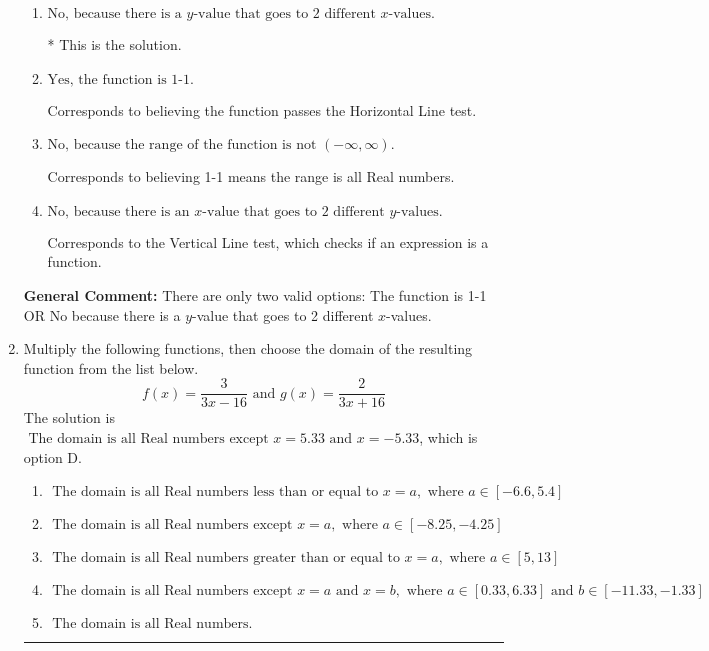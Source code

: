 \documentclass{extbook}[14pt]
\newcommand{\litem}[1]{\item #1

\rule{\textwidth}{0.4pt}}
\begin{document}
\begin{enumerate}
{\begin{enumerate}[label=\Alph*.]
Corresponds to believing 1-1 means the domain is all Real numbers.
\item \( \text{No, because there is a $y$-value that goes to 2 different $x$-values.} \)

* This is the solution.
\item \( \text{Yes, the function is 1-1.} \)

Corresponds to believing the function passes the Horizontal Line test.
\item \( \text{No, because the range of the function is not $(-\infty, \infty)$.} \)

Corresponds to believing 1-1 means the range is all Real numbers.
\item \( \text{No, because there is an $x$-value that goes to 2 different $y$-values.} \)

Corresponds to the Vertical Line test, which checks if an expression is a function.
\end{enumerate}

\textbf{General Comment:} There are only two valid options: The function is 1-1 OR No because there is a $y$-value that goes to 2 different $x$-values.
}
\litem{
Multiply the following functions, then choose the domain of the resulting function from the list below.
\[ f(x) = \frac{3}{3x-16} \text{ and } g(x) = \frac{2}{3x+16} \]The solution is \( \text{ The domain is all Real numbers except } x = 5.33 \text{ and } x = -5.33 \), which is option D.\begin{enumerate}[label=\Alph*.]
\item \( \text{ The domain is all Real numbers less than or equal to } x = a, \text{ where } a \in [-6.6, 5.4] \)


\item \( \text{ The domain is all Real numbers except } x = a, \text{ where } a \in [-8.25, -4.25] \)


\item \( \text{ The domain is all Real numbers greater than or equal to } x = a, \text{ where } a \in [5, 13] \)


\item \( \text{ The domain is all Real numbers except } x = a \text{ and } x = b, \text{ where } a \in [0.33, 6.33] \text{ and } b \in [-11.33, -1.33] \)


\item \( \text{ The domain is all Real numbers. } \)


\end{enumerate}

}
\end{enumerate}
\end{document}
